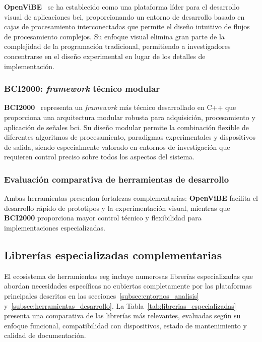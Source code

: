 \textbf{OpenViBE}~\cite{openvibe} se ha establecido como una plataforma líder para el desarrollo visual de aplicaciones \acrshort{bci}, proporcionando un entorno de desarrollo basado en cajas de procesamiento interconectadas que permite el diseño intuitivo de flujos de procesamiento complejos. Su enfoque visual elimina gran parte de la complejidad de la programación tradicional, permitiendo a investigadores concentrarse en el diseño experimental en lugar de los detalles de implementación.

\subsubsection{BCI2000: \textit{framework} técnico modular}
\label{subsubsec:bci2000}

\textbf{BCI2000}~\cite{schalk2004bci2000} representa un \textit{framework} más técnico desarrollado en C++ que proporciona una arquitectura modular robusta para adquisición, procesamiento y aplicación de señales \acrshort{bci}. Su diseño modular permite la combinación flexible de diferentes algoritmos de procesamiento, paradigmas experimentales y dispositivos de salida, siendo especialmente valorado en entornos de investigación que requieren control preciso sobre todos los aspectos del sistema.

\subsubsection{Evaluación comparativa de herramientas de desarrollo}
\label{subsubsec:evaluacion_herramientas}

Ambas herramientas presentan fortalezas complementarias: \textbf{OpenViBE} facilita el desarrollo rápido de prototipos y la experimentación visual, mientras que \textbf{BCI2000} proporciona mayor control técnico y flexibilidad para implementaciones especializadas.

\subsection{Librerías especializadas complementarias}
\label{subsec:librerias_especializadas}

El ecosistema de herramientas \acrshort{eeg} incluye numerosas librerías especializadas que abordan necesidades específicas no cubiertas completamente por las plataformas principales descritas en las secciones~\ref{subsec:entornos_analisis} y~\ref{subsec:herramientas_desarrollo}. La Tabla~\ref{tab:librerias_especializadas} presenta una comparativa de las librerías más relevantes, evaluadas según su enfoque funcional, compatibilidad con dispositivos, estado de mantenimiento y calidad de documentación.


